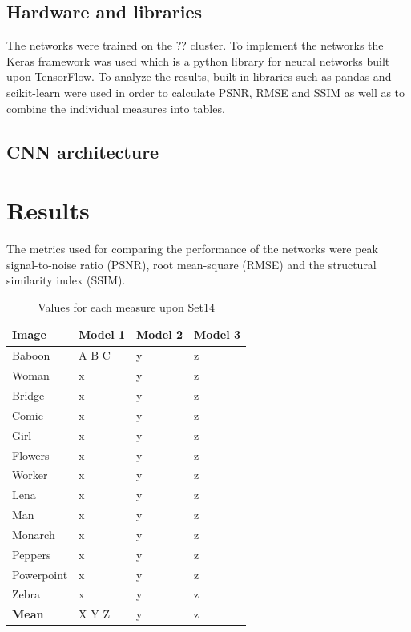 \documentclass[letterpaper,twocolumn,fleqn]{article}
\begin{document}
\subsection{Hardware and libraries}
The networks were trained on the ?? cluster. To implement the networks the Keras framework was used which is a python library for neural networks built upon TensorFlow. To analyze the results, built in libraries such as pandas and scikit-learn were used in order to calculate PSNR, RMSE and SSIM as well as to combine the individual measures into tables. 


\subsection{CNN architecture}




\section{Results}

The metrics used for comparing the performance of the networks were peak signal-to-noise ratio (PSNR), root mean-square (RMSE) and the structural similarity index (SSIM). 


\begin{table}[!h]
\caption{Values for each measure upon Set14}
\label{tab:fonts}
\begin{center}       
\begin{tabular}{|p{}|p{}|p{}|p{}|} 
\hline
Image & Model 1 & Model 2 & Model 3 \\ \hline
Baboon & A B C & y & z \\ \hline
Woman & x & y & z \\ \hline
Bridge & x & y & z \\ \hline
Comic & x & y & z \\ \hline
Girl & x & y & z \\ \hline
Flowers & x & y & z \\ \hline
Worker & x & y & z \\ \hline
Lena & x & y & z \\ \hline
Man & x & y & z \\ \hline
Monarch & x & y & z \\ \hline
Peppers & x & y & z \\ \hline
Powerpoint & x & y & z \\ \hline
Zebra & x & y & z \\ \hline
\textbf{Mean} & X Y Z & y & z \\ \hline
\end{tabular}
\end{center}
\end{table} 
\end{document}
